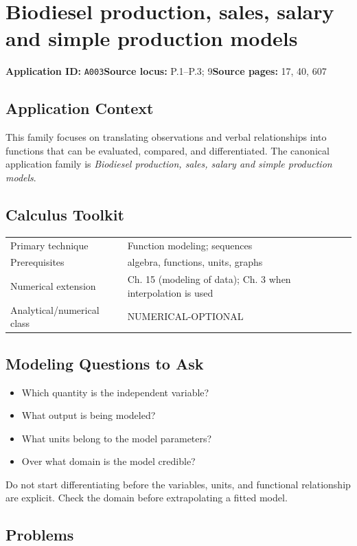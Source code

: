 \documentclass[11pt]{book}
\newcommand{\pid}[1]{\texttt{#1}}
\begin{document}
\chapter{Biodiesel production, sales, salary and simple production models}\label{app:A003}
\textbf{Application ID:} \pid{A003}\quad \textbf{Source locus:} P.1–P.3; 9\quad \textbf{Source pages:} 17, 40, 607
\section*{Application Context}
This family focuses on translating observations and verbal relationships into functions that can be evaluated, compared, and differentiated. The canonical application family is \emph{Biodiesel production, sales, salary and simple production models}.
\section*{Calculus Toolkit}
\begin{tabularx}{\textwidth}{@{}lX@{}}\toprule
Primary technique & Function modeling; sequences \\
Prerequisites & algebra, functions, units, graphs \\
Numerical extension & Ch. 15 (modeling of data); Ch. 3 when interpolation is used \\
Analytical/numerical class & NUMERICAL-OPTIONAL \\
\bottomrule\end{tabularx}
\section*{Modeling Questions to Ask}\begin{itemize}
\item Which quantity is the independent variable?
\item What output is being modeled?
\item What units belong to the model parameters?
\item Over what domain is the model credible?
\end{itemize}
\begin{errorbox}Do not start differentiating before the variables, units, and functional relationship are explicit. Check the domain before extrapolating a fitted model.\end{errorbox}
\section*{Problems}
\end{document}

